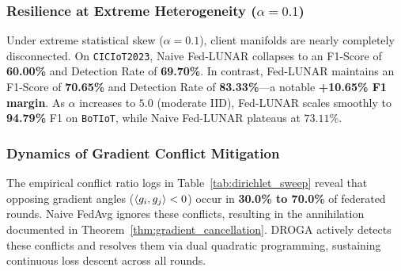 \subsubsection{Resilience at Extreme Heterogeneity ($\alpha = 0.1$)}
Under extreme statistical skew ($\alpha = 0.1$), client manifolds are nearly completely disconnected. On \texttt{CICIoT2023}, Naive Fed-LUNAR collapses to an F1-Score of \textbf{60.00\%} and Detection Rate of \textbf{69.70\%}. In contrast, Fed-LUNAR maintains an F1-Score of \textbf{70.65\%} and Detection Rate of \textbf{83.33\%}---a notable \textbf{+10.65\% F1 margin}. As $\alpha$ increases to $5.0$ (moderate IID), Fed-LUNAR scales smoothly to \textbf{94.79\%} F1 on \texttt{BoTIoT}, while Naive Fed-LUNAR plateaus at $73.11\%$.

\subsubsection{Dynamics of Gradient Conflict Mitigation}
The empirical conflict ratio logs in Table~\ref{tab:dirichlet_sweep} reveal that opposing gradient angles ($\left\langle g_i,g_j\right\rangle < 0$) occur in \textbf{30.0\% to 70.0\%} of federated rounds. Naive FedAvg ignores these conflicts, resulting in the annihilation documented in Theorem~\ref{thm:gradient_cancellation}. DROGA actively detects these conflicts and resolves them via dual quadratic programming, sustaining continuous loss descent across all rounds.

